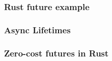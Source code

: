 % 
% 
% 
\begin{frame}[fragile]
    \frametitle{Rust future example}
\end{frame}
% 
% 
% 
% 
% 
% 
\begin{frame}[fragile]
    \frametitle{Async Lifetimes}
\end{frame}
% 
% 
% 
% 
% 
% 
% 
% 
\begin{frame}[fragile]
    \frametitle{Zero-cost futures in Rust}
\end{frame}
